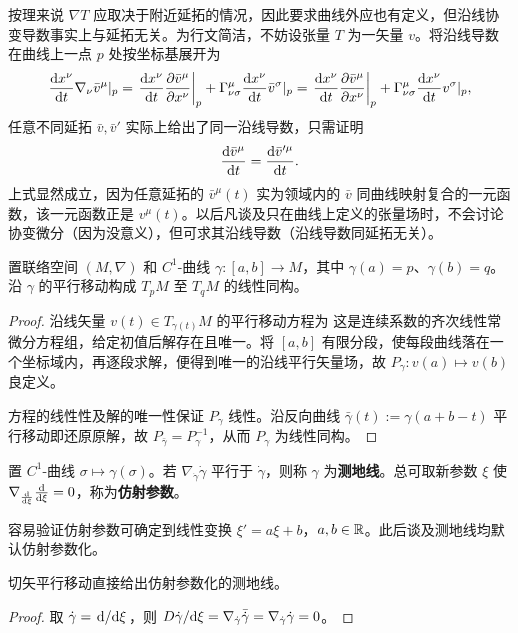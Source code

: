 按理来说 $\nabla T$ 应取决于附近延拓的情况，因此要求曲线外应也有定义，但沿线协变导数事实上与延拓无关。为行文简洁，不妨设张量 $T$ 为一矢量 $v$。将沿线导数在曲线上一点 $p$ 处按坐标基展开为
    \[
    \dv{x^\nu}{t}\nabla_\nu \bar v^\mu|_p=\eval{\dv{x^\nu}{t}\pdv{\bar v^\mu}{x^\nu}}_p +\Gamma^\mu_{\nu\sigma}\dv{x^\nu}{t}\bar v^\sigma|_p=\eval{\dv{x^\nu}{t}\pdv{\bar v^\mu}{x^\nu}}_p +\Gamma^\mu_{\nu\sigma}\dv{x^\nu}{t} v^\sigma|_p,
    \]
    任意不同延拓 $\bar v,\bar v'$ 实际上给出了同一沿线导数，只需证明
    \[
    \dv{\bar v^\mu}{t}=\dv{\bar v'^\mu}{t}.
    \]
    上式显然成立，因为任意延拓的 $\bar v^\mu(t)$ 实为领域内的 $\bar v$ 同曲线映射复合的一元函数，该一元函数正是 $v^\mu(t)$。以后凡谈及只在曲线上定义的张量场时，不会讨论协变微分（因为没意义），但可求其沿线导数（沿线导数同延拓无关）。

\begin{theorem}
    置联络空间 $(M,\nabla)$ 和 $C^1$-曲线 $\gamma:[a,b]\to M$，其中 $\gamma(a)=p$、$\gamma(b)=q$。沿 $\gamma$ 的平行移动构成 $T_pM$ 至 $T_qM$ 的线性同构。
\end{theorem}
\begin{proof}
    沿线矢量 $v(t)\in T_{\gamma(t)}M$ 的平行移动方程为
    这是连续系数的齐次线性常微分方程组，给定初值后解存在且唯一。将 $[a,b]$ 有限分段，使每段曲线落在一个坐标域内，再逐段求解，便得到唯一的沿线平行矢量场，故 $P_\gamma:v(a)\mapsto v(b)$ 良定义。

    方程的线性性及解的唯一性保证 $P_\gamma$ 线性。沿反向曲线 $\bar\gamma(t):=\gamma(a+b-t)$ 平行移动即还原原解，故 $P_{\bar\gamma}=P_\gamma^{-1}$，从而 $P_\gamma$ 为线性同构。
\end{proof}


\begin{definition}
    置 $C^1$-曲线 $\sigma\mapsto\gamma(\sigma)$。若 $\nabla_{\dot\gamma} \dot\gamma$ 平行于 $\dot\gamma$，则称 $\gamma$ 为\textbf{测地线}。总可取新参数 $\xi$ 使 $\nabla_{\dv{\xi}} \dv{\xi}=0$，称为\textbf{仿射参数}。
\end{definition}
\begin{remark}
    容易验证仿射参数可确定到线性变换 $\xi'=a\xi +b$，$a,b\in\mathbb{R}$。此后谈及测地线均默认仿射参数化。
\end{remark}
 

\begin{theorem}
    切矢平行移动直接给出仿射参数化的测地线。
\end{theorem}
\begin{proof}
取 $\dot\gamma=\dv*{\xi}$，则 ${D \dot\gamma}/{\dd \xi}=\nabla_{\dot\gamma} \bar{\dot\gamma}=\nabla_{\dot\gamma} {\dot\gamma}=0$。
\end{proof}

